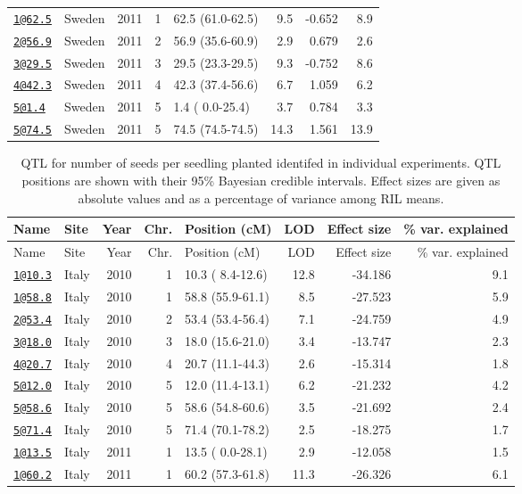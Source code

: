 \documentclass[]{article}
\begin{document}
\begin{longtable}[]{@{}llrrlrrr@{}}
\href{mailto:1@62.5}{\nolinkurl{1@62.5}} & Sweden & 2011 & 1 & 62.5
(61.0-62.5) & 9.5 & -0.652 & 8.9\tabularnewline
\href{mailto:2@56.9}{\nolinkurl{2@56.9}} & Sweden & 2011 & 2 & 56.9
(35.6-60.9) & 2.9 & 0.679 & 2.6\tabularnewline
\href{mailto:3@29.5}{\nolinkurl{3@29.5}} & Sweden & 2011 & 3 & 29.5
(23.3-29.5) & 9.3 & -0.752 & 8.6\tabularnewline
\href{mailto:4@42.3}{\nolinkurl{4@42.3}} & Sweden & 2011 & 4 & 42.3
(37.4-56.6) & 6.7 & 1.059 & 6.2\tabularnewline
\href{mailto:5@1.4}{\nolinkurl{5@1.4}} & Sweden & 2011 & 5 & 1.4 (
0.0-25.4) & 3.7 & 0.784 & 3.3\tabularnewline
\href{mailto:5@74.5}{\nolinkurl{5@74.5}} & Sweden & 2011 & 5 & 74.5
(74.5-74.5) & 14.3 & 1.561 & 13.9\tabularnewline
\bottomrule
\end{longtable}

\newpage

\begin{longtable}[]{@{}llrrlrrr@{}}
\caption{QTL for number of seeds per seedling planted identifed in
individual experiments. QTL positions are shown with their 95\% Bayesian
credible intervals. Effect sizes are given as absolute values and as a
percentage of variance among RIL means.}\tabularnewline
\toprule
Name & Site & Year & Chr. & Position (cM) & LOD & Effect size & \% var.
explained\tabularnewline
\midrule
\endfirsthead
\toprule
Name & Site & Year & Chr. & Position (cM) & LOD & Effect size & \% var.
explained\tabularnewline
\midrule
\endhead
\href{mailto:1@10.3}{\nolinkurl{1@10.3}} & Italy & 2010 & 1 & 10.3 (
8.4-12.6) & 12.8 & -34.186 & 9.1\tabularnewline
\href{mailto:1@58.8}{\nolinkurl{1@58.8}} & Italy & 2010 & 1 & 58.8
(55.9-61.1) & 8.5 & -27.523 & 5.9\tabularnewline
\href{mailto:2@53.4}{\nolinkurl{2@53.4}} & Italy & 2010 & 2 & 53.4
(53.4-56.4) & 7.1 & -24.759 & 4.9\tabularnewline
\href{mailto:3@18.0}{\nolinkurl{3@18.0}} & Italy & 2010 & 3 & 18.0
(15.6-21.0) & 3.4 & -13.747 & 2.3\tabularnewline
\href{mailto:4@20.7}{\nolinkurl{4@20.7}} & Italy & 2010 & 4 & 20.7
(11.1-44.3) & 2.6 & -15.314 & 1.8\tabularnewline
\href{mailto:5@12.0}{\nolinkurl{5@12.0}} & Italy & 2010 & 5 & 12.0
(11.4-13.1) & 6.2 & -21.232 & 4.2\tabularnewline
\href{mailto:5@58.6}{\nolinkurl{5@58.6}} & Italy & 2010 & 5 & 58.6
(54.8-60.6) & 3.5 & -21.692 & 2.4\tabularnewline
\href{mailto:5@71.4}{\nolinkurl{5@71.4}} & Italy & 2010 & 5 & 71.4
(70.1-78.2) & 2.5 & -18.275 & 1.7\tabularnewline
\href{mailto:1@13.5}{\nolinkurl{1@13.5}} & Italy & 2011 & 1 & 13.5 (
0.0-28.1) & 2.9 & -12.058 & 1.5\tabularnewline
\href{mailto:1@60.2}{\nolinkurl{1@60.2}} & Italy & 2011 & 1 & 60.2
(57.3-61.8) & 11.3 & -26.326 & 6.1\tabularnewline

\end{longtable}
\end{document}
